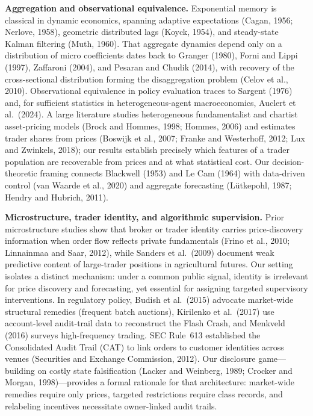 \documentclass[11pt,letterpaper]{article}
\theoremstyle{definition}
\begin{document}
\textbf{Aggregation and observational equivalence.} Exponential memory is classical in dynamic economics, spanning adaptive expectations (Cagan, 1956; Nerlove, 1958), geometric distributed lags (Koyck, 1954), and steady-state Kalman filtering (Muth, 1960). That aggregate dynamics depend only on a distribution of micro coefficients dates back to Granger (1980), Forni and Lippi (1997), Zaffaroni (2004), and Pesaran and Chudik (2014), with recovery of the cross-sectional distribution forming the disaggregation problem (Celov et al., 2010). Observational equivalence in policy evaluation traces to Sargent (1976) and, for sufficient statistics in heterogeneous-agent macroeconomics, Auclert et al.\ (2024). A large literature studies heterogeneous fundamentalist and chartist asset-pricing models (Brock and Hommes, 1998; Hommes, 2006) and estimates trader shares from prices (Boswijk et al., 2007; Franke and Westerhoff, 2012; Lux and Zwinkels, 2018); our results establish precisely which features of a trader population are recoverable from prices and at what statistical cost. Our decision-theoretic framing connects Blackwell (1953) and Le Cam (1964) with data-driven control (van Waarde et al., 2020) and aggregate forecasting (L\"utkepohl, 1987; Hendry and Hubrich, 2011).

\textbf{Microstructure, trader identity, and algorithmic supervision.} Prior microstructure studies show that broker or trader identity carries price-discovery information when order flow reflects private fundamentals (Frino et al., 2010; Linnainmaa and Saar, 2012), while Sanders et al.\ (2009) document weak predictive content of large-trader positions in agricultural futures. Our setting isolates a distinct mechanism: under a common public signal, identity is irrelevant for price discovery and forecasting, yet essential for assigning targeted supervisory interventions. In regulatory policy, Budish et al.\ (2015) advocate market-wide structural remedies (frequent batch auctions), Kirilenko et al.\ (2017) use account-level audit-trail data to reconstruct the Flash Crash, and Menkveld (2016) surveys high-frequency trading. SEC Rule~613 established the Consolidated Audit Trail (CAT) to link orders to customer identities across venues (Securities and Exchange Commission, 2012). Our disclosure game—building on costly state falsification (Lacker and Weinberg, 1989; Crocker and Morgan, 1998)—provides a formal rationale for that architecture: market-wide remedies require only prices, targeted restrictions require class records, and relabeling incentives necessitate owner-linked audit trails.
\end{document}
